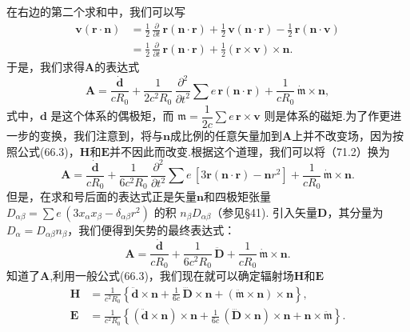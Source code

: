 在右边的第二个求和中，我们可以写
\begin{equation*}
\begin{aligned}
  \boldsymbol{v}(\boldsymbol{r}\cdot\boldsymbol{n})
  &=\frac{1}{2}\,\frac{\partial}{\partial t}\,\boldsymbol{r}(\boldsymbol{n}\cdot\boldsymbol{r})
  +\frac{1}{2}\,\boldsymbol{v}(\boldsymbol{n}\cdot\boldsymbol{r})
  -\frac{1}{2}\,\boldsymbol{r}(\boldsymbol{n}\cdot\boldsymbol{v})\\
  &=\frac{1}{2}\,\frac{\partial}{\partial t}\,\boldsymbol{r}(\boldsymbol{n}\cdot\boldsymbol{r})
  +\frac{1}{2}(\boldsymbol{r}\times\boldsymbol{v})\times\boldsymbol{n}.
\end{aligned}
\end{equation*}
于是，我们求得$\boldsymbol{A}$的表达式
\begin{equation}
  \boldsymbol{A}=\frac{\dot{\boldsymbol{d}}}{cR_0}
  +\frac{1}{2c^2R_0}\,\frac{\partial^2}{\partial t^2}\sum e\,\boldsymbol{r}(\boldsymbol{n}\cdot\boldsymbol{r})
  +\frac{1}{cR_0}\,\dot{\mathfrak{m}}\times\boldsymbol{n},
\end{equation}
式中，$\boldsymbol{d}$ 是这个体系的偶极矩，而 $\mathfrak{m}=\dfrac{1}{2c}\sum e\,\boldsymbol{r}\times\boldsymbol{v}$ 则是体系的磁矩.为了作更进一步的变换，我们注意到，将与$\boldsymbol{n}$成比例的任意矢量加到$\boldsymbol{A}$上并不改变场，因为按照公式(66.3)，$\boldsymbol{H}$和$\boldsymbol{E}$并不因此而改变.根据这个道理，我们可以将（71.2）换为
\begin{equation*}
  \boldsymbol{A}=\frac{\dot{\boldsymbol{d}}}{cR_0}
  +\frac{1}{6c^2R_0}\,\frac{\partial^2}{\partial t^2}\sum e\,[3\boldsymbol{r}(\boldsymbol{n}\cdot\boldsymbol{r})-\boldsymbol{n}r^2]
  +\frac{1}{cR_0}\,\dot{\mathfrak{m}}\times\boldsymbol{n}.
\end{equation*}
但是，在求和号后面的表达式正是矢量$\boldsymbol{n}$和四极矩张量 $D_{\alpha\beta}=\sum e\,(3x_\alpha x_\beta-\delta_{\alpha\beta}r^2)$ 的积 $n_\beta D_{\alpha\beta}$（参见§41). 引入矢量$\boldsymbol{D}$，其分量为 $D_\alpha=D_{\alpha\beta}n_\beta$，我们便得到矢势的最终表达式：
\begin{equation}
  \boldsymbol{A}=\frac{\dot{\boldsymbol{d}}}{cR_0}
  +\frac{1}{6c^2R_0}\,\ddot{\boldsymbol{D}}
  +\frac{1}{cR_0}\,\dot{\mathfrak{m}}\times\boldsymbol{n}.
\end{equation}
知道了$\boldsymbol{A}$,利用一般公式(66.3)，我们现在就可以确定辐射场$\boldsymbol{H}$和$\boldsymbol{E}$
\begin{equation}
\begin{aligned}
  \boldsymbol{H}&=\frac{1}{c^2R_0}\left\{\ddot{\boldsymbol{d}}\times\boldsymbol{n}
  +\frac{1}{6c}\,\dddot{\boldsymbol{D}}\times\boldsymbol{n}
  +(\ddot{\mathfrak{m}}\times\boldsymbol{n})\times\boldsymbol{n}\right\},\\
  \boldsymbol{E}&=\frac{1}{c^2R_0}\left\{(\ddot{\boldsymbol{d}}\times\boldsymbol{n})\times\boldsymbol{n}
  +\frac{1}{6c}\,(\dddot{\boldsymbol{D}}\times\boldsymbol{n})\times\boldsymbol{n}
  +\boldsymbol{n}\times\ddot{\mathfrak{m}}\right\}.
\end{aligned}
\end{equation}
